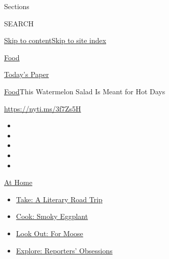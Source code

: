 Sections

SEARCH

\protect\hyperlink{site-content}{Skip to
content}\protect\hyperlink{site-index}{Skip to site index}

\href{https://www.nytimes3xbfgragh.onion/section/food}{Food}

\href{https://myaccount.nytimes3xbfgragh.onion/auth/login?response_type=cookie\&client_id=vi}{}

\href{https://www.nytimes3xbfgragh.onion/section/todayspaper}{Today's
Paper}

\href{/section/food}{Food}\textbar{}This Watermelon Salad Is Meant for
Hot Days

\url{https://nyti.ms/3f7Zs5H}

\begin{itemize}
\item
\item
\item
\item
\item
\end{itemize}

\href{https://www.nytimes3xbfgragh.onion/spotlight/at-home?action=click\&pgtype=Article\&state=default\&region=TOP_BANNER\&context=at_home_menu}{At
Home}

\begin{itemize}
\tightlist
\item
  \href{https://www.nytimes3xbfgragh.onion/2020/07/28/books/time-for-a-literary-road-trip.html?action=click\&pgtype=Article\&state=default\&region=TOP_BANNER\&context=at_home_menu}{Take:
  A Literary Road Trip}
\item
  \href{https://www.nytimes3xbfgragh.onion/2020/07/29/magazine/bored-with-your-home-cooking-some-smoky-eggplant-will-fix-that.html?action=click\&pgtype=Article\&state=default\&region=TOP_BANNER\&context=at_home_menu}{Cook:
  Smoky Eggplant}
\item
  \href{https://www.nytimes3xbfgragh.onion/2020/07/27/travel/moose-michigan-isle-royale.html?action=click\&pgtype=Article\&state=default\&region=TOP_BANNER\&context=at_home_menu}{Look
  Out: For Moose}
\item
  \href{https://www.nytimes3xbfgragh.onion/interactive/2020/at-home/even-more-reporters-editors-diaries-lists-recommendations.html?action=click\&pgtype=Article\&state=default\&region=TOP_BANNER\&context=at_home_menu}{Explore:
  Reporters' Obsessions}
\end{itemize}


